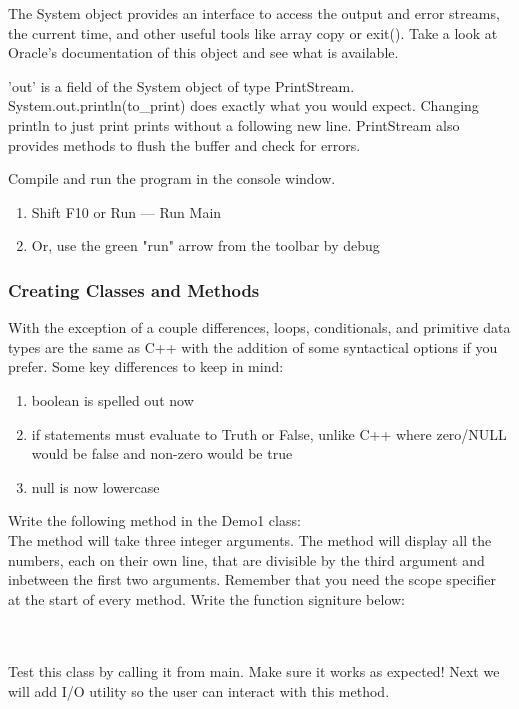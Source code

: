 \documentclass[../../main.tex]{subfiles}
\begin{document}
\begin{steps}
   \item The System object provides an interface to access the output and error streams, the current time, and other useful tools like array copy or exit(). Take a look at Oracle's documentation of this object and see what is available.

   \item 'out' is a field of the System object of type PrintStream. System.out.println(to_print) does exactly what you would expect. Changing println to just print prints without a following new line. PrintStream also provides methods to flush the buffer and check for errors.
   \item Compile and run the program in the console window.
   \begin{enumerate}[label=\Alph*.]
   \item Shift F10 or Run --- Run Main
   \item Or, use the green "run" arrow from the toolbar by debug
   \end{enumerate}
\end{steps}
\subsubsection{Creating Classes and Methods}
   \begin{steps}
      \item With the exception of a couple differences, loops, conditionals, and primitive
         data types are the same as C++ with the addition of some syntactical options if
         you prefer. Some key differences to keep in mind:
   \begin{enumerate}[label=\Alph*.]
      \item boolean is spelled out now
      \item if statements must evaluate to Truth or False, unlike C++ where zero/NULL
         would be false and non-zero would be true
      \item null is now lowercase
   \end{enumerate}
   \item Write the following method in the Demo1 class: \\
      The method will take three integer arguments. The method will display all the numbers,
      each on their own line, that are divisible by the third argument and inbetween the first
      two arguments. Remember that you need the scope specifier at the start of every method.
      Write the function signiture below: \\
      \vspace{1cm}\\
      \underline{\hspace{15cm}}\\
      \item Test this class by calling it from main. Make sure it works as expected!
         Next we will add I/O utility so the user can interact with this method.
   \end{steps}
\end{document}
